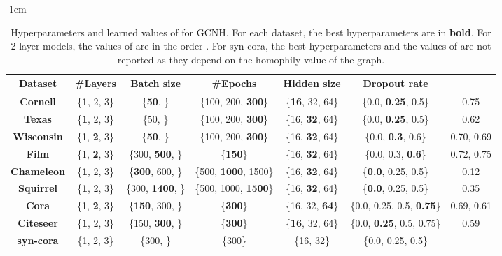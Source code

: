 \documentclass[conference]{IEEEtran}
\begin{document}
\begin{table*}[t]
    \centering
    \footnotesize
    \addtolength{\leftskip} {-1cm}
    \addtolength{\rightskip}{-1cm}
    \begin{tabular}{ c c c c c c c }
    \toprule
    \textbf{Dataset} & \textbf{\#Layers} & \textbf{Batch size} & \textbf{\#Epochs} & \textbf{Hidden size} & \textbf{Dropout rate} &  \\
    \midrule
    \textbf{Cornell} & \{\textbf{1}, 2, 3\} & \{\textbf{50}, \} & \{100, 200, \textbf{300}\} & \{\textbf{16}, 32, 64\} & \{0.0, \textbf{0.25}, 0.5\} & 0.75 \\
    \textbf{Texas} & \{\textbf{1}, 2, 3\} & \{50, \} & \{100, 200, \textbf{300}\} & \{16, \textbf{32}, 64\} & \{0.0, \textbf{0.25}, 0.5\} & 0.62 \\
    \textbf{Wisconsin} & \{1, \textbf{2}, 3\} & \{\textbf{50}, \} & \{100, 200, \textbf{300}\} & \{16, \textbf{32}, 64\} & \{0.0, \textbf{0.3}, 0.6\} & 0.70, 0.69\\
    \textbf{Film} & \{1, \textbf{2}, 3\} & \{300, \textbf{500}, \} & \{\textbf{150}\} & \{16, \textbf{32}, 64\} & \{0.0, 0.3, \textbf{0.6}\} & 0.72, 0.75 \\
    \textbf{Chameleon} & \{\textbf{1}, 2, 3\} & \{\textbf{300}, 600, \} & \{500, \textbf{1000}, 1500\} & \{16, \textbf{32}, 64\} & \{\textbf{0.0}, 0.25, 0.5\} & 0.12 \\
    \textbf{Squirrel} & \{\textbf{1}, 2, 3\} & \{300, \textbf{1400}, \} & \{500, 1000, \textbf{1500}\} & \{16, \textbf{32}, 64\} & \{\textbf{0.0}, 0.25, 0.5\} & 0.35 \\
    \textbf{Cora} & \{1, \textbf{2}, 3\} & \{\textbf{150}, 300, \} & \{\textbf{300}\} & \{16, 32, \textbf{64}\} & \{0.0, 0.25, 0.5, \textbf{0.75}\} & 0.69, 0.61 \\
    \textbf{Citeseer} & \{\textbf{1}, 2, 3\} & \{150, \textbf{300}, \} & \{\textbf{300}\} & \{\textbf{16}, 32, 64\} & \{0.0, \textbf{0.25}, 0.5, 0.75\} & 0.59 \\
    \textbf{syn-cora} & \{1, 2, 3\} & \{300, \} & \{300\} & \{16, 32\} & \{0.0, 0.25, 0.5\} \\
    \bottomrule
    
    \end{tabular}
    \caption{Hyperparameters and learned values of  for GCNH. For each dataset, the best hyperparameters are in \textbf{bold}. For 2-layer models, the values of  are in the order . For syn-cora, the best hyperparameters and the values of  are not reported as they depend on the homophily value of the graph.} 
    \label{tab:gcnh_hyp}
\end{table*}
\end{document}
